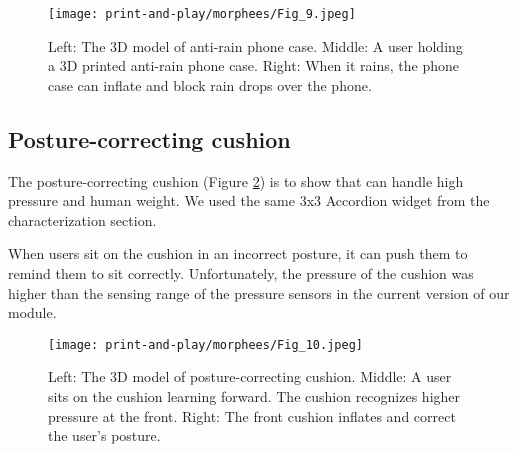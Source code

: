       \begin{figure}[htb]
        \centering
        \texttt{[image: print-and-play/morphees/Fig\_9.jpeg]}
        \caption{Left: The 3D model of anti-rain phone case. Middle: A user
          holding a 3D printed anti-rain phone case. Right: When it rains, the
          phone case can inflate and block rain drops over the phone.}
        \label{fig:appl_rainphone}
      \end{figure}
    
    \subsection{Posture-correcting cushion}
      The posture-correcting cushion (Figure \ref{fig:appl_cushion}) is to show
      that \mp can handle high pressure and human weight.  We used the same 3x3
      Accordion widget from the characterization section.
      
      When users sit on the cushion in an incorrect posture, it can push them to
      remind them to sit correctly. Unfortunately, the pressure of the cushion
      was higher than the sensing range of the pressure sensors in the current
      version of our module.
      
      \begin{figure}[htb]
        \centering
        \texttt{[image: print-and-play/morphees/Fig\_10.jpeg]}
        \caption{Left: The 3D model of posture-correcting cushion. Middle: A
          user sits on the cushion learning forward. The cushion recognizes higher
          pressure at the front. Right: The front cushion inflates and correct the
          user's posture.}
        \label{fig:appl_cushion}
      \end{figure}
        
